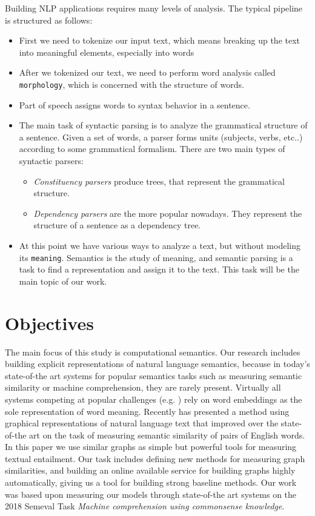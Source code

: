 Building NLP applications requires many levels of analysis.
The typical pipeline is structured as follows:
\begin{itemize}
	\item First we need to tokenize our input text, which means breaking up the text into meaningful elements, especially into words
	\item After we tokenized our text, we need to perform word analysis called \texttt{morphology}, which is concerned with the structure of words.
	\item Part of speech assigns words to syntax behavior in a sentence.
	\item The main task of syntactic parsing is to analyze the grammatical structure of a sentence. Given a set of words, a parser forms units (subjects, verbs, etc..) according to some grammatical formalism.
	There are two main types of syntactic parsers:
	\begin{itemize}
		\item \textit{Constituency parsers} produce trees, that represent the grammatical structure.
		\item \textit{Dependency parsers} are the more popular nowadays. They represent the structure of a sentence as a dependency tree.
	\end{itemize}
	\item At this point we have various ways to analyze a text, but without modeling its \texttt{meaning}. Semantics is the study of meaning, and semantic parsing is a task to find a representation and assign it to the text. This task will be the main topic of our work.
\end{itemize}
\section{Objectives}
The main focus of this study is computational semantics. Our research includes building explicit representations of natural language semantics, because in today's state-of-the art systems for popular semantics tasks such as measuring semantic similarity or machine comprehension, they are rarely present. Virtually all systems
competing at popular challenges (e.g. \cite{Cer:2017,Collados:2017}) rely on word embeddings as the sole representation of word meaning. Recently \cite{Recski:2016c} has presented a method using graphical representations of natural language text that improved over the state-of-the art on the task of
measuring semantic similarity of pairs of English words. In this paper
we use similar graphs as simple but powerful tools for measuring textual
entailment. Our task includes defining new methods for measuring graph similarities, and building an online available service for building graphs highly automatically, giving us a tool for building strong baseline methods. Our work was based upon measuring our models through state-of-the art systems on the 2018 Semeval Task \textit{Machine comprehension using commonsense knowledge}.

